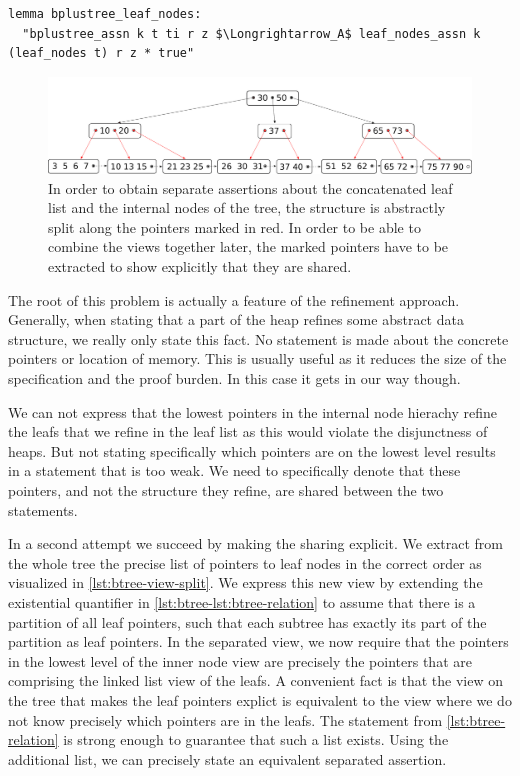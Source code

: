 \documentclass[a4paper,UKenglish,cleveref, autoref, thm-restate]{lipics-v2021}
\newcommand{\btree}{B$^+$-Tree}
\begin{document}
\begin{lstlisting}[mathescape=true, language=Isabelle,label=lst:btree-view-split-oneway]
lemma bplustree_leaf_nodes:
  "bplustree_assn k t ti r z $\Longrightarrow_A$ leaf_nodes_assn k (leaf_nodes t) r z * true"
\end{lstlisting}

\begin{figure}
    \centering
    \includegraphics[width=1\linewidth]{btree-view-split.pdf}
    \caption[Split view of the \btree]
    {In order to obtain separate assertions about the concatenated leaf list
    and the internal nodes of the tree, the structure is abstractly split along the
    pointers marked in red. In order to be able to combine the views together later,
    the marked pointers have to be extracted to show explicitly that they are shared.}
    \label{fig:btree-view-split}
\end{figure}

The root of this problem is actually a feature of the refinement approach.
Generally, when stating that a part of the heap
refines some abstract data structure,
we really only state this fact.
No statement is made about the concrete pointers
or location of memory.
This is usually useful as it reduces the size of the specification
and the proof burden.
In this case it gets in our way though.


We can not express that the lowest pointers
in the internal node hierachy refine the leafs
that we refine in the leaf list
as this would violate the disjunctness of heaps.
But not stating specifically which pointers
are on the lowest level results in a statement that 
is too weak.
We need to specifically denote that these pointers,
and not the structure they refine,
are shared between the two statements.

In a second attempt we succeed by making the sharing explicit.
We extract from the whole tree the precise list of pointers to leaf nodes
in the correct order as visualized in \autoref{lst:btree-view-split}.
We express this new view by extending the existential quantifier in \autoref{lst:btree-lst:btree-relation}
to assume that there is a partition of all leaf pointers,
such that each subtree has exactly its part of the partition as leaf pointers.
In the separated view, we now require that the pointers
in the lowest level of the inner node view are precisely the pointers
that are comprising the linked list view of the leafs.
A convenient fact is that the view on the tree that makes the leaf pointers explict
is equivalent to the view where we do not know precisely which pointers are in the leafs.
The statement from \autoref{lst:btree-relation} is strong enough to guarantee that such a list exists.
Using the additional list, we can precisely state an equivalent
separated assertion.
\end{document}
